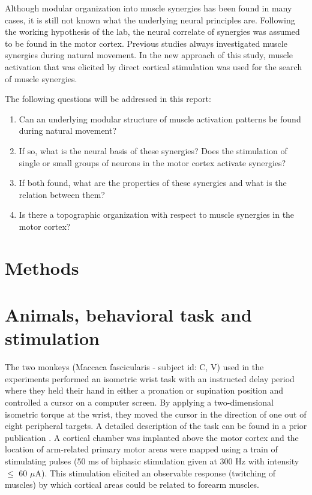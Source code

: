 \documentclass[a4paper]{article}
\begin{document}
Although modular organization into muscle synergies has been found in many cases, it is still not known what the underlying neural principles are. Following the working hypothesis of the lab, the neural correlate of synergies was assumed to be found in the motor cortex. Previous studies always investigated muscle synergies during natural movement. In the new approach of this study, muscle activation that was elicited by direct cortical stimulation was used for the search of muscle synergies.


\bigskip

The following questions will be addressed in this report:

\begin{enumerate}
	\item Can an underlying modular structure of muscle activation patterns be found during natural movement?
	\item If so, what is the neural basis of these synergies? Does the stimulation of single or small groups of neurons in the motor cortex activate synergies?
	\item If both found, what are the properties of these synergies and what is the relation between them?
	\item Is there a topographic organization with respect to muscle synergies in the motor cortex?
\end{enumerate}



\section{Methods} %
\label{sg:sec:methods}

% 
\section{Animals, behavioral task and stimulation} %
\label{sg:sec:animals_and_behavioral_task}

The two monkeys (Maccaca fascicularis - subject id: C, V) used in the experiments performed an isometric wrist task with an instructed delay period where they held their hand in either a pronation or supination position and controlled a cursor on a computer screen. By applying a two-dimensional isometric torque at the wrist, they moved the cursor in the direction of one out of eight peripheral targets. A detailed description of the task can be found in a prior publication \cite{Yanai:2007p2455}.
A cortical chamber was implanted above the motor cortex and the location of arm-related primary motor areas were mapped using a train of stimulating pulses (50 ms of biphasic stimulation given at 300 Hz with intensity $\leq$ 60 $\mu$A). This stimulation elicited an observable response (twitching of muscles) by which cortical areas could be related to forearm muscles. 
\end{document}
